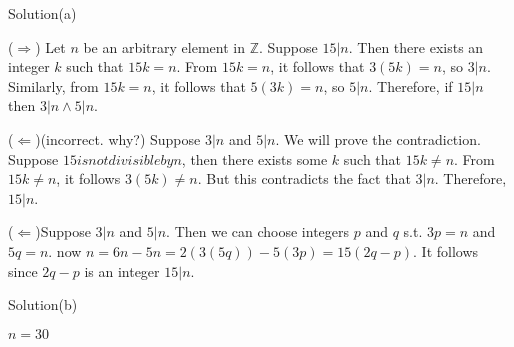 \documentclass{article}
\begin{document}
Solution(a)

($\Rightarrow$) Let $n$ be an arbitrary element in $\mathbb{Z}$.
Suppose $15 | n$. Then there exists an integer $k$ such that $15k =
n$. From $15k = n$, it follows that $3(5k) = n$, so $3 | n$.
Similarly, from $15k = n$, it follows that $5(3k) = n$, so $5|n$.
Therefore, if $15 | n$ then $3|n \land 5|n$.

($\Leftarrow$)(incorrect. why?) Suppose $3|n$ and $5|n$. We will prove the
contradiction. Suppose $15 is not divisible by n$, then there exists
some $k$ such that $15 k \neq n$. From $15k \neq n$, it follows $3(5k)
\neq n$. But this contradicts the fact that $3|n$. Therefore, $15 |
n$.

($\Leftarrow$)Suppose $3|n$ and $5|n$. Then we can choose 
integers $p$ and $q$ s.t. $3p = n$ and $5q = n$.
now $n = 6n-5n = 2(3(5q)) - 5(3p) = 15(2q-p)$.
It follows since $2q-p$ is an integer $15|n$.

Solution(b)

$n = 30$
\end{document}
